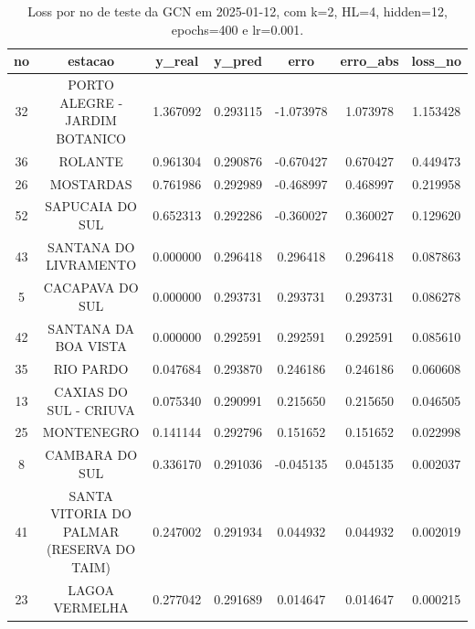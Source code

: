 \begin{table}[h]
\centering
\caption{Loss por no de teste da GCN em 2025-01-12, com k=2, HL=4, hidden=12, epochs=400 e lr=0.001.}
\label{tab:gcn_loss_k2_hl4_h12_e400_d20250112}
\begin{tabular}{ccccccc}
\toprule
no & estacao & y\_real & y\_pred & erro & erro\_abs & loss\_no \\
\midrule
32 & PORTO ALEGRE - JARDIM BOTANICO & 1.367092 & 0.293115 & -1.073978 & 1.073978 & 1.153428 \\
36 & ROLANTE & 0.961304 & 0.290876 & -0.670427 & 0.670427 & 0.449473 \\
26 & MOSTARDAS & 0.761986 & 0.292989 & -0.468997 & 0.468997 & 0.219958 \\
52 & SAPUCAIA DO SUL & 0.652313 & 0.292286 & -0.360027 & 0.360027 & 0.129620 \\
43 & SANTANA DO LIVRAMENTO & 0.000000 & 0.296418 & 0.296418 & 0.296418 & 0.087863 \\
5 & CACAPAVA DO SUL & 0.000000 & 0.293731 & 0.293731 & 0.293731 & 0.086278 \\
42 & SANTANA DA BOA VISTA & 0.000000 & 0.292591 & 0.292591 & 0.292591 & 0.085610 \\
35 & RIO PARDO & 0.047684 & 0.293870 & 0.246186 & 0.246186 & 0.060608 \\
13 & CAXIAS DO SUL - CRIUVA & 0.075340 & 0.290991 & 0.215650 & 0.215650 & 0.046505 \\
25 & MONTENEGRO & 0.141144 & 0.292796 & 0.151652 & 0.151652 & 0.022998 \\
8 & CAMBARA DO SUL & 0.336170 & 0.291036 & -0.045135 & 0.045135 & 0.002037 \\
41 & SANTA VITORIA DO PALMAR (RESERVA DO TAIM) & 0.247002 & 0.291934 & 0.044932 & 0.044932 & 0.002019 \\
23 & LAGOA VERMELHA & 0.277042 & 0.291689 & 0.014647 & 0.014647 & 0.000215 \\
\bottomrule
\end{tabular}
\end{table}
